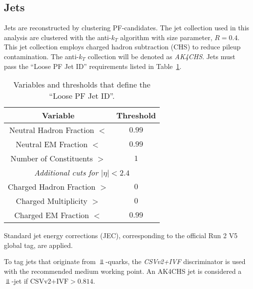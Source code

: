 \subsection{Jets}
\label{subsec:obj_jets}

Jets are reconstructed by clustering PF-candidates. The jet collection used in this analysis are clustered with the anti-$k_T$ algorithm with size parameter, $R=0.4$. This jet collection employs charged hadron subtraction (CHS) to reduce pileup contamination. The anti-$k_T$ collection will be denoted as \emph{AK4CHS}. Jets must pass the ``Loose PF Jet ID'' requirements listed in Table~\ref{tab:jetid}.  %

\begin{table}[!ht]
\centering
\begin{tabular}{|c|c|}
\hline
  Variable                     &  Threshold \\
\hline
  Neutral Hadron Fraction $<$  & $0.99$     \\
  Neutral EM Fraction $<$      & $0.99$     \\
  Number of Constituents $>$   & $1$        \\
\hline
  \multicolumn{2}{|c|}{\emph{Additional cuts for $|\eta|<2.4$}} \\
\hline
  Charged Hadron Fraction $>$  & $0$        \\
  Charged Multiplicity $>$     & $0$        \\
  Charged EM Fraction $<$      & $0.99$     \\
\hline
\end{tabular}
\caption{Variables and thresholds that define the ``Loose PF Jet ID''.}
\label{tab:jetid}
\end{table}

Standard jet energy corrections (JEC), corresponding to the official Run 2 V5 global tag, are applied. %

To tag jets that originate from $\Bot$-quarks, the \emph{CSVv2+IVF} discriminator is used with the recommended medium working point. An AK4CHS jet is considered a $\Bot$-jet if $\mbox{CSVv2+IVF} > 0.814$.
